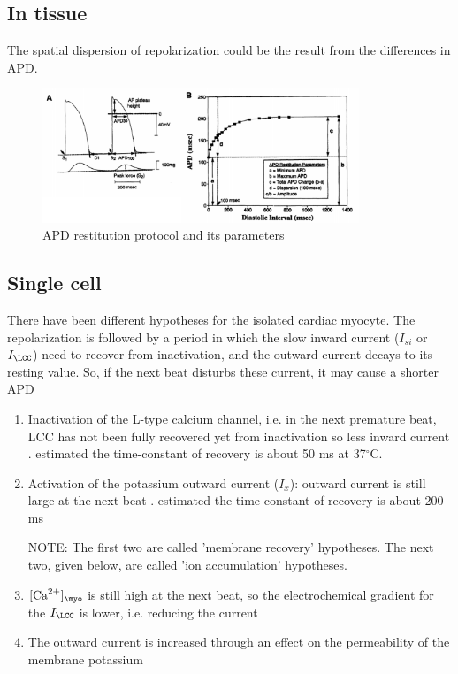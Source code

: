 \subsection{In tissue}

The spatial dispersion of repolarization could be the result from the
differences in APD.

\begin{figure}[hbt]
 \centerline{\includegraphics[height=4cm,
 angle=0]{./images/APD_restitution_protocol.eps}} 
 \caption{APD restitution protocol and its parameters \cite{Kobayashi1992}}
\label{fig:APD_restitution_protocol}
\end{figure}


\subsection{Single cell}

There have been different hypotheses for the isolated cardiac myocyte. The
repolarization is followed by a period in which the slow inward current
($I_{si}$ or $I_\LCC$) need to recover from inactivation, and the outward
current decays to its resting value. So, if the next beat disturbs these
current, it may cause a shorter APD \citep{boyett1978}
\begin{enumerate}
  \item Inactivation of the L-type calcium channel, i.e. in the next premature
  beat, LCC has not been fully recovered yet from inactivation so less inward
  current \citep{gettes1974}. \citep{beeler1977rap} estimated the time-constant
  of recovery is about 50 ms at 37$^\circ$C.
  
  \item Activation of the potassium outward current ($I_x$): outward current is
  still large at the next beat \citep{deHemptinne1971, hauswirth1972}. 
  \citep{beeler1977rap} estimated the time-constant of recovery is about 200 ms
  
NOTE: The first two are called 'membrane recovery' hypotheses. The next two,
given below, are called 'ion accumulation' hypotheses.

  \item $[\Ca]_\myo$ is still high at the next beat, so the electrochemical
  gradient for the $I_\LCC$ is lower, i.e. reducing the current
  \citep{reuter1973dcc}

  \item The outward current is increased through an effect on the permeability
  of the membrane potassium \citep{meech1976, bassingthwaighte1976} 
\end{enumerate}

